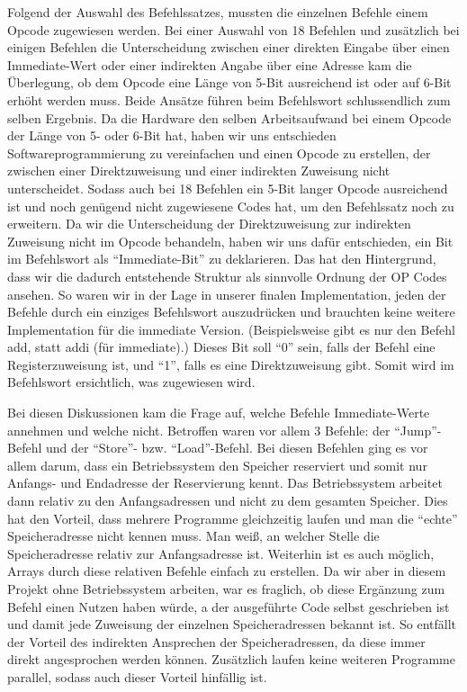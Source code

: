 \documentclass[paper=a4,fontsize=12pt]{scrreprt}
\begin{document}
Folgend der Auswahl des Befehlssatzes, mussten die einzelnen Befehle einem Opcode zugewiesen werden. Bei einer Auswahl von 18 Befehlen und zusätzlich bei einigen Befehlen die Unterscheidung zwischen einer direkten Eingabe über einen Immediate-Wert oder einer indirekten Angabe über eine Adresse kam die Überlegung, ob dem Opcode eine Länge von 5-Bit ausreichend ist oder auf 6-Bit erhöht werden muss. Beide Ansätze führen beim Befehlswort schlussendlich zum selben Ergebnis. Da die Hardware den selben Arbeitsaufwand bei einem Opcode der Länge von 5- oder 6-Bit hat, haben wir uns entschieden Softwareprogrammierung zu vereinfachen und einen Opcode zu erstellen, der zwischen einer Direktzuweisung und einer indirekten Zuweisung nicht unterscheidet. Sodass auch bei 18 Befehlen ein 5-Bit langer Opcode ausreichend ist und noch genügend nicht zugewiesene Codes hat, um den Befehlssatz noch zu erweitern.
Da wir die Unterscheidung der Direktzuweisung zur indirekten Zuweisung nicht im Opcode behandeln, haben wir uns dafür entschieden, ein Bit im Befehlswort als \enquote{Immediate-Bit} zu deklarieren.
Das hat den Hintergrund, dass wir die dadurch entstehende Struktur als sinnvolle Ordnung der OP Codes ansehen. So waren wir in der Lage in unserer finalen Implementation, jeden der Befehle durch ein einziges Befehlswort auszudrücken und brauchten keine weitere Implementation für die immediate Version. (Beispielsweise gibt es nur den Befehl add, statt addi (für immediate).) Dieses Bit soll \enquote{0} sein, falls der Befehl eine Registerzuweisung ist, und \enquote{1}, falls es eine Direktzuweisung gibt. Somit wird im Befehlswort ersichtlich, was zugewiesen wird.

Bei diesen Diskussionen kam die Frage auf, welche Befehle Immediate-Werte annehmen und welche nicht. Betroffen waren vor allem 3 Befehle: der \enquote{Jump}-Befehl und der \enquote{Store}- bzw. \enquote{Load}-Befehl. Bei diesen Befehlen ging es vor allem darum, dass ein Betriebssystem den Speicher reserviert und somit nur Anfangs- und Endadresse der Reservierung kennt. Das Betriebssystem arbeitet dann relativ zu den Anfangsadressen und nicht zu dem gesamten Speicher. Dies hat den Vorteil, dass mehrere Programme gleichzeitig laufen und man die \enquote{echte} Speicheradresse nicht kennen muss. Man weiß, an welcher Stelle die Speicheradresse relativ zur Anfangsadresse ist. Weiterhin ist es auch möglich, Arrays durch diese relativen Befehle einfach zu erstellen. Da wir aber in diesem Projekt ohne Betriebssystem arbeiten, war es fraglich, ob diese Ergänzung zum Befehl einen Nutzen haben würde, a der ausgeführte Code selbst geschrieben ist und damit jede Zuweisung der einzelnen Speicheradressen bekannt ist. So entfällt der Vorteil des indirekten Ansprechen der Speicheradressen, da diese immer direkt angesprochen werden können. Zusätzlich laufen keine weiteren Programme parallel, sodass auch dieser Vorteil hinfällig ist.
\end{document}
